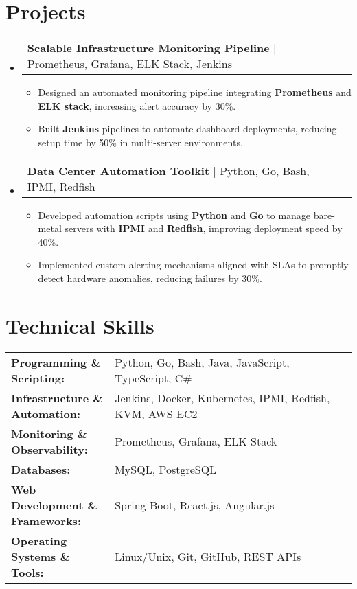 \documentclass[letterpaper,11pt]{article}
\makeatletter
\newcommand{\resumeItem}[1]{
  \item\footnotesize{
    {#1 \vspace{-2pt}}
  }
}
\newcommand{\resumeProjectHeading}[2]{
    \item
    \begin{tabular*}{1.001\textwidth}{l@{\extracolsep{\fill}}r}
      \small#1 & \textbf{\small #2}\\
    \end{tabular*}\vspace{-7pt}
}
\newcommand{\resumeSubHeadingListStart}{\begin{itemize}[leftmargin=0pt, label={}]}
\newcommand{\resumeSubHeadingListEnd}{\end{itemize}}
\newcommand{\resumeItemListStart}{\begin{itemize}[leftmargin=*]}
\newcommand{\resumeItemListEnd}{\end{itemize}\vspace{-5pt}}
\makeatother
\begin{document}
\section{Projects}
    \vspace{-5pt}
    \resumeSubHeadingListStart
      \resumeProjectHeading
          {\textbf{Scalable Infrastructure Monitoring Pipeline} | Prometheus, Grafana, ELK Stack, Jenkins}{}
          \resumeItemListStart
              \resumeItem{Designed an automated monitoring pipeline integrating \textbf{Prometheus} and \textbf{ELK stack}, increasing alert accuracy by 30\%.}
              \resumeItem{Built \textbf{Jenkins} pipelines to automate dashboard deployments, reducing setup time by 50\% in multi-server environments.}
          \resumeItemListEnd
          \vspace{-16pt}
      \resumeProjectHeading
          {\textbf{Data Center Automation Toolkit} | Python, Go, Bash, IPMI, Redfish}{}
          \resumeItemListStart
              \resumeItem{Developed automation scripts using \textbf{Python} and \textbf{Go} to manage bare-metal servers with \textbf{IPMI} and \textbf{Redfish}, improving deployment speed by 40\%.}
              \resumeItem{Implemented custom alerting mechanisms aligned with SLAs to promptly detect hardware anomalies, reducing failures by 30\%.}
          \resumeItemListEnd
          \vspace{-16pt}
    \resumeSubHeadingListEnd
\vspace{-10pt}
\section{Technical Skills}
        \vspace{-14pt}
        \begin{table}[h]
            \footnotesize
            \begin{tabular}{p{0.3\linewidth} p{0.7\linewidth}}
                \textbf{Programming \& Scripting:} & Python, Go, Bash, Java, JavaScript, TypeScript, C\# \\
                \textbf{Infrastructure \& Automation:} & Jenkins, Docker, Kubernetes, IPMI, Redfish, KVM, AWS EC2 \\
                \textbf{Monitoring \& Observability:} & Prometheus, Grafana, ELK Stack \\
                \textbf{Databases:} & MySQL, PostgreSQL \\
                \textbf{Web Development \& Frameworks:} & Spring Boot, React.js, Angular.js \\
                \textbf{Operating Systems \& Tools:} & Linux/Unix, Git, GitHub, REST APIs \\
            \end{tabular}
        \end{table}
\end{document}
